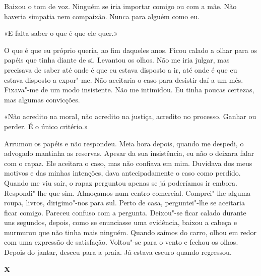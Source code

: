 Baixou o tom de voz. Ninguém se iria importar comigo ou com a mãe. Não
haveria simpatia nem compaixão. Nunca para alguém como eu.

«E falta saber o que é que ele quer.»

O que é que eu próprio queria, ao fim daqueles anos. Ficou calado a
olhar para os papéis que tinha diante de si. Levantou os olhos. Não me
iria julgar, mas precisava de saber até onde é que eu estava disposto a
ir, até onde é que eu estava disposto a expor"-me. Não aceitaria o caso
para desistir daí a um mês. Fixava"-me de um modo insistente. Não me
intimidou. Eu tinha poucas certezas, mas algumas convicções.

«Não acredito na moral, não acredito na justiça, acredito no processo.
Ganhar ou perder. É o único critério.»

Arrumou os papéis e não respondeu. Meia hora depois, quando me despedi,
o advogado mantinha as reservas. Apesar da sua insistência, eu não o
deixara falar com o rapaz. Ele aceitara o caso, mas não confiava em mim.
Duvidava dos meus motivos e das minhas intenções, dava antecipadamente o
caso como perdido. Quando me viu sair, o rapaz perguntou apenas se já
poderíamos ir embora. Respondi"-lhe que sim. Almoçamos num centro
comercial. Comprei"-lhe alguma roupa, livros, dirigimo"-nos para sul.
Perto de casa, perguntei"-lhe se aceitaria ficar comigo. Pareceu confuso
com a pergunta. Deixou"-se ficar calado durante uns segundos, depois,
como se enunciasse uma evidência, baixou a cabeça e murmurou que não
tinha mais ninguém. Quando saímos do carro, olhou em redor com uma
expressão de satisfação. Voltou"-se para o vento e fechou os olhos.
Depois do jantar, desceu para a praia. Já estava escuro quando
regressou.

\vspace*{1.8cm}
\noindent{}\textbf{X}

\bigskip

